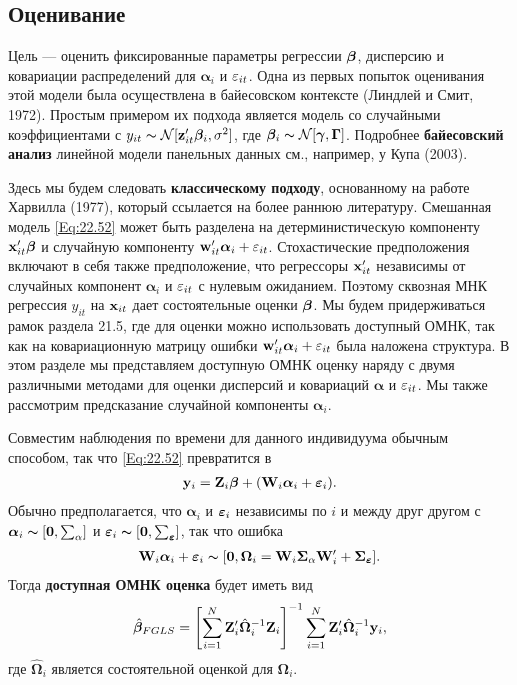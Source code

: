  \subsection{Оценивание}

Цель --- оценить фиксированные параметры регрессии $\bm{\beta}$, дисперсию и ковариации распределений для $\bm\alpha_i$ и $\varepsilon_{it}$. Одна из первых попыток оценивания этой модели была осуществлена в байесовском контексте  (Линдлей и Смит, 1972). Простым примером их подхода является модель со случайными коэффициентами с $y_{it} \thicksim \mathcal N [\mathbf z'_{it}\bm{\beta}_i, \sigma^2]$, где $\bm{\beta}_i \thicksim \mathcal N [\bm\gamma, \bm\Gamma]$. Подробнее \textbf{байесовский анализ} линейной модели панельных данных см., например,  у Купа (2003).

Здесь мы будем следовать \textbf{классическому подходу}, основанному на работе Харвилла (1977), который ссылается на более раннюю литературу. Смешанная модель \ref{Eq:22.52}  может быть разделена на детерминистическую компоненту $\mathbf{x}'_{it} \bm{\beta}$ и случайную компоненту $\mathbf w'_{it} \bm\alpha_i+\varepsilon_{it}$. Стохастические предположения включают в себя также предположение, что регрессоры $\mathbf{x}'_{it}$ независимы от случайных компонент $\bm\alpha_i$ и $\varepsilon_{it}$  с нулевым ожиданием. Поэтому сквозная МНК регрессия $y_{it}$ на $\mathbf{x}_{it}$  дает состоятельные оценки $\bm{\beta}$. Мы будем придерживаться рамок раздела 21.5, где для оценки можно  использовать доступный ОМНК, так как на ковариационную матрицу ошибки $\mathbf w'_{it} \bm\alpha_i+\varepsilon_{it}$ была наложена структура. В этом разделе мы представляем доступную ОМНК оценку наряду с двумя различными методами для оценки дисперсий и ковариаций $\bm\alpha$ и $\varepsilon_{it}$. Мы также рассмотрим предсказание случайной компоненты $\bm\alpha_i$.

Совместим наблюдения по времени для данного индивидуума обычным способом, так что \ref{Eq:22.52} превратится в
\begin{align}
\mathbf y_i=\mathbf Z_i \bm{\beta}+(\mathbf W_i \bm\alpha_i+\bm{\varepsilon}_i).
\label{Eq:22.53}
\end{align}
Обычно предполагается, что $\bm\alpha_i$ и $\bm{\varepsilon}_i$  независимы по $i$  и между друг другом с $\bm\alpha_i \thicksim [\mathbf 0, \sum_{\alpha}]$ и $\bm{\varepsilon}_i \thicksim [ \mathbf 0, \sum_{\bm{\varepsilon}}]$, так что ошибка 
 \begin{align}
\mathbf W_i \bm\alpha_i+\bm{\varepsilon}_i \thicksim [\mathbf 0, \bm\Omega_i = \mathbf W_i \bm\Sigma_{\alpha} \mathbf W'_i + \bm\Sigma_{\bm{\varepsilon}}].
\nonumber
\end{align}
Тогда \textbf{доступная ОМНК оценка} будет иметь вид
\begin{align}
 \hat{\bm{\beta}}_{FGLS}=\left[ \sum^N_{i=1} \mathbf Z'_i \hat{\bm\Omega}^{-1}_i \mathbf Z_i 
\right] ^{-1}
\sum^N_{i=1} \mathbf Z'_i \hat{\bm\Omega}^{-1}_i \mathbf y_i,
\label{Eq:22.54}
\end{align}
где $\hat{\bm\Omega}_i$ является состоятельной оценкой для $\bm\Omega_i$.

